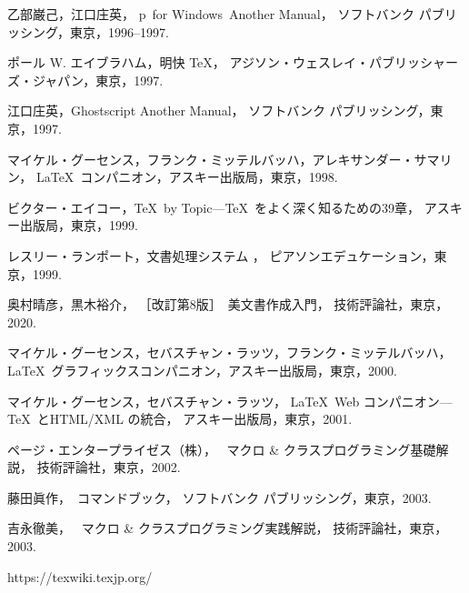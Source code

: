 \documentclass[technicalreport]{ieicej}
\begin{document}
\begin{thebibliography}{99}
乙部巌己，江口庄英，
p\LaTeXe\ for Windows\ Another Manual，
ソフトバンク パブリッシング，東京，1996--1997. 

ポール W. エイブラハム，明快 \TeX{}，
アジソン・ウェスレイ・パブリッシャーズ・ジャパン，東京，1997. 

江口庄英，Ghostscript Another Manual，
ソフトバンク パブリッシング，東京，1997. 

マイケル・グーセンス，フランク・ミッテルバッハ，アレキサンダー・サマリン，
\LaTeX\ コンパニオン，アスキー出版局，東京，1998. 

ビクター・エイコー，\TeX\ by Topic---\TeX\ をよく深く知るための39章，
アスキー出版局，東京，1999. 

レスリー・ランポート，文書処理システム \LaTeXe{}，
ピアソンエデュケーション，東京，1999. 

奥村晴彦，黒木裕介，
［改訂第8版］\LaTeXe\ 美文書作成入門，
技術評論社，東京，2020.

マイケル・グーセンス，セバスチャン・ラッツ，フランク・ミッテルバッハ，
\LaTeX\ グラフィックスコンパニオン，アスキー出版局，東京，2000. 

マイケル・グーセンス，セバスチャン・ラッツ，
\LaTeX\ Web コンパニオン---\TeX\ とHTML/XML の統合，
アスキー出版局，東京，2001. 

ページ・エンタープライゼス\<（株）\<，
\LaTeXe\ マクロ \& クラスプログラミング基礎解説，
技術評論社，東京，2002. 

藤田眞作，\LaTeXe\ コマンドブック，
ソフトバンク パブリッシング，東京，2003. 

吉永徹美，
\LaTeXe\ マクロ \& クラスプログラミング実践解説，
技術評論社，東京，2003. 

https://texwiki.texjp.org/
\end{thebibliography}
\end{document}
